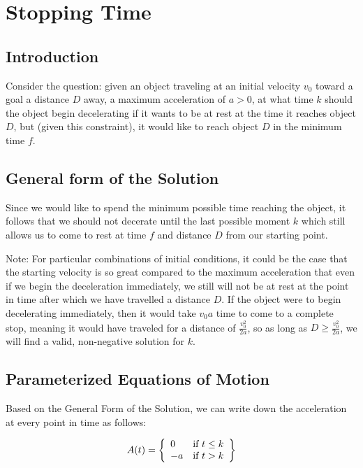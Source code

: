 \documentclass[a4paper,12pt]{article}
\begin{document}
\section*{Stopping Time}

\subsection*{Introduction}
Consider the question: given an object traveling at an initial velocity
$v_0$ toward a goal a distance $D$ away, a maximum acceleration of $a > 0$,
at what time $k$ should the object begin decelerating if it wants to
be at rest at the time it reaches object $D$, but (given this constraint),
it would like to reach object $D$ in the minimum time $f$.

\subsection*{General form of the Solution}

Since we would like to spend the minimum possible time reaching the object,
it follows that we should not decerate until the last possible moment $k$
which still allows us to come to rest at time $f$ and distance $D$ from
our starting point.

\begin{tcolorbox}
  Note: For particular combinations of initial conditions, it could be
  the case that the starting velocity is so great compared to the maximum
  acceleration that even if we begin the deceleration immediately,
  we still will not be at rest at the point in time after which we have
  travelled a distance $D$.
  If the object were to begin decelerating immediately, then it would
  take $v_0a$ time to come to a complete stop, meaning it would have
  traveled for a distance of $\frac{v_0^2}{2a}$, so as long as
  $D \geq \frac{v_0^2}{2a}$, we will find a valid, non-negative
  solution for $k$.
\end{tcolorbox}

\subsection*{Parameterized Equations of Motion}

Based on the General Form of the Solution, we can write down the
acceleration at every point in time as follows:

$$
  A(t) = \left\{
    \begin{array}{ll}
      0  & \mbox{if $t \leq k$} \\
      -a & \mbox{if $t > k$}
    \end{array}\\
  \right\}
$$
\end{document}
